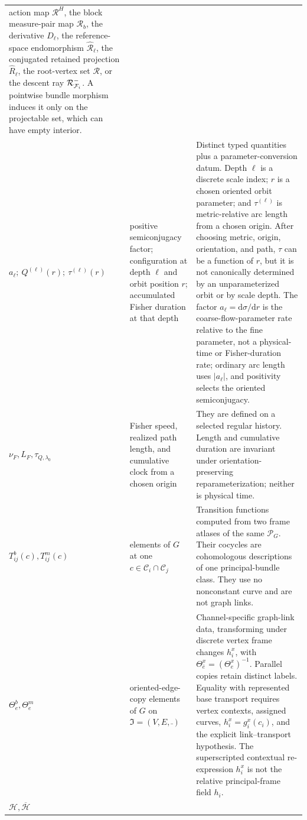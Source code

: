 \begin{longtable}{@{}>{\raggedright\arraybackslash}p{}
>{\raggedright\arraybackslash}p{}
>{\raggedright\arraybackslash}p{}@{}}
action map \(\mathcal R^H\), the block measure-pair map \(\mathcal R_b\), the
derivative \(D_\ell\), the reference-space endomorphism
\(\widehat{\mathcal R}_\ell\), the conjugated retained projection
\(\widehat R_\ell\), the root-vertex set \(\mathcal R\), or the descent ray
\(\mathcal R^-_{\mathcal F_i}\).  A pointwise bundle morphism induces it only on
the projectable set, which can have empty interior. \\
\(a_\ell;\ Q^{(\ell)}(r);\ \tau^{(\ell)}(r)\) &
positive semiconjugacy factor; configuration at depth \(\ell\) and orbit
position \(r\); accumulated Fisher duration at that depth &
Distinct typed quantities plus a parameter-conversion datum.  Depth \(\ell\)
is a discrete scale index; \(r\) is a chosen oriented orbit parameter; and
\(\tau^{(\ell)}\) is metric-relative arc length from a chosen origin.  After
choosing metric, origin, orientation, and path, \(\tau\) can be a function of
\(r\), but it is not canonically determined by an unparameterized orbit or by
scale depth.  The factor \(a_\ell=\mathrm d\sigma/\mathrm dr\) is the
coarse-flow-parameter rate relative to the fine parameter, not a physical-time
or Fisher-duration rate; ordinary arc length uses \(\lvert a_\ell\rvert\), and
positivity selects the oriented semiconjugacy. \\
\(\nu_F,L_F,\tau_{Q,\lambda_0}\) &
Fisher speed, realized path length, and cumulative clock from a chosen origin &
They are defined on a selected regular history. Length and cumulative duration
are invariant under orientation-preserving reparameterization; neither is
physical time. \\
\(T_{ij}^b(c),T_{ij}^m(c)\) &
elements of \(G\) at one \(c\in\mathcal C_i\cap\mathcal C_j\) &
Transition functions computed from two frame atlases of the same \(\mathscr P_G\).
Their cocycles are cohomologous descriptions of one principal-bundle class.
They use no nonconstant curve and are not graph links. \\
\(\Theta_e^b,\Theta_e^m\) &
oriented-edge-copy elements of \(G\) on
\(\mathfrak I=(V,E,\bar{\ })\) &
Channel-specific graph-link data, transforming under discrete vertex frame changes
\(h_i^x\), with \(\Theta_{\bar e}^x=(\Theta_e^x)^{-1}\). Parallel copies
retain distinct labels. Equality with represented base transport requires
vertex contexts, assigned curves, \(h_i^x=g_i^x(c_i)\), and the explicit
link--transport hypothesis.  The superscripted contextual re-expression
\(h_i^x\) is not the relative principal-frame field \(h_i\). \\
\(\mathcal H,\overline{\mathcal H}\) &

\end{longtable}
